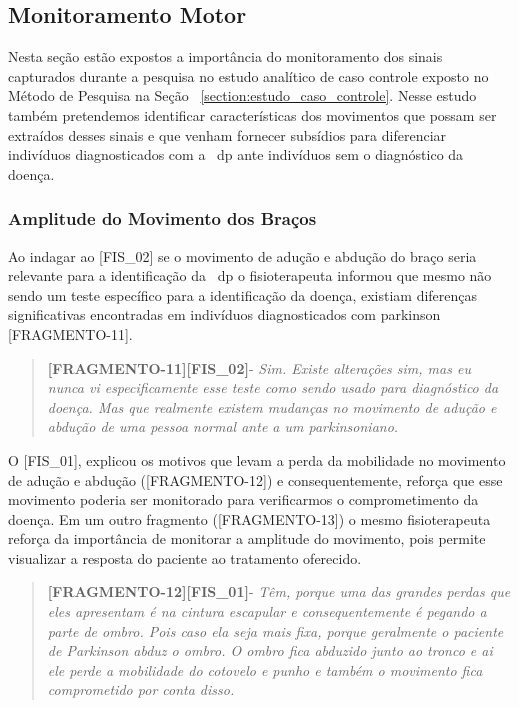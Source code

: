 \subsection{Monitoramento Motor}
Nesta seção estão expostos a importância do monitoramento dos sinais capturados durante a pesquisa no estudo analítico de caso controle exposto no Método de Pesquisa na Seção ~\ref{section:estudo_caso_controle}. Nesse estudo também pretendemos identificar características dos movimentos que possam ser extraídos desses sinais e que venham fornecer subsídios para diferenciar indivíduos diagnosticados com a ~\ac{dp} ante indivíduos sem o diagnóstico da doença.

\subsubsection{Amplitude do Movimento dos Braços}

Ao indagar ao [FIS\_02] se o movimento de adução e abdução do braço seria relevante para a identificação da ~\ac{dp} o fisioterapeuta informou que mesmo não sendo um teste específico para a identificação da doença, existiam diferenças significativas encontradas em indivíduos diagnosticados com parkinson [FRAGMENTO-11].
\begin{quote}
\textbf{[FRAGMENTO-11][FIS\_02]}-
\emph{
Sim. Existe alterações sim, mas eu nunca vi especificamente esse teste como sendo usado para diagnóstico da doença. Mas que realmente existem mudanças no movimento de adução e abdução de uma pessoa normal ante a um parkinsoniano.
}
\end{quote}

O [FIS\_01], explicou os motivos que levam a perda da mobilidade no movimento de adução e abdução ([FRAGMENTO-12]) e consequentemente, reforça que esse movimento poderia ser monitorado para verificarmos o comprometimento da doença. Em um outro fragmento ([FRAGMENTO-13]) o mesmo fisioterapeuta reforça da importância de monitorar a amplitude do movimento, pois permite visualizar a resposta do paciente ao tratamento oferecido.

\begin{quote}
\textbf{[FRAGMENTO-12][FIS\_01]}-
\emph{
Têm, porque uma das grandes perdas que eles apresentam é na cintura escapular e consequentemente é pegando a parte de ombro. Pois caso ela seja mais fixa, porque geralmente o paciente de Parkinson abduz o ombro. O ombro fica abduzido junto ao tronco e ai ele perde a mobilidade do cotovelo e punho e também o movimento fica comprometido por conta disso.
}
\end{quote}

